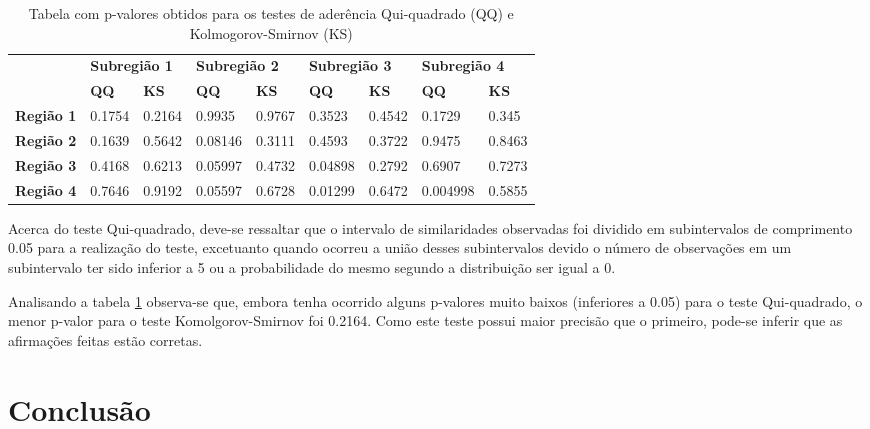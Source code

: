 \documentclass[12pt]{article}
\begin{document}
\begin{table}[!ht]
\centering

    \caption{Tabela com p-valores obtidos para os testes de aderência Qui-quadrado (QQ) e Kolmogorov-Smirnov (KS)}
    \label{tab:pvalues_table}     

    \begin{small}
    \begin{tabular}{|l|l|l|l|l|l|l|l|l|}
    \hline
    & \multicolumn{2}{|l|}{\bfseries Subregião 1} & \multicolumn{2}{l|}{\bfseries Subregião 2} & \multicolumn{2}{|l|}{\bfseries Subregião 3} & \multicolumn{2}{l|}{\bfseries Subregião 4} \\
    & {\bfseries QQ} & {\bfseries KS} & {\bfseries QQ} & {\bfseries KS} & {\bfseries QQ} & {\bfseries KS} & {\bfseries QQ} & {\bfseries KS} \\
    \hline
    {\bfseries Região 1} & 0.1754 & 0.2164 & 0.9935 & 0.9767 & 0.3523 & 0.4542 & 0.1729 & 0.345 \\
    {\bfseries Região 2} & 0.1639 & 0.5642 & 0.08146 & 0.3111 & 0.4593 & 0.3722 & 0.9475 & 0.8463 \\
    {\bfseries Região 3} & 0.4168 & 0.6213 & 0.05997 & 0.4732 & 0.04898 & 0.2792 & 0.6907 & 0.7273 \\
    {\bfseries Região 4} & 0.7646 & 0.9192 & 0.05597 & 0.6728 & 0.01299 & 0.6472 & 0.004998 & 0.5855 \\
    \hline
    \end{tabular} 
    \end{small} 
\end{table}

Acerca do teste Qui-quadrado, deve-se ressaltar que o intervalo de similaridades observadas foi dividido em subintervalos de comprimento 0.05 para a realização do teste, excetuanto quando ocorreu a união desses subintervalos devido o número de observações em um subintervalo ter sido inferior a 5 ou a probabilidade do mesmo segundo a distribuição ser igual a 0.

Analisando a tabela \ref{tab:pvalues_table} observa-se que, embora tenha ocorrido alguns p-valores muito baixos (inferiores a 0.05) para o teste Qui-quadrado, o menor p-valor para o teste Komolgorov-Smirnov foi 0.2164. Como este teste possui maior precisão que o primeiro, pode-se inferir que as afirmações feitas estão corretas.

\section{Conclusão}
\end{document}
